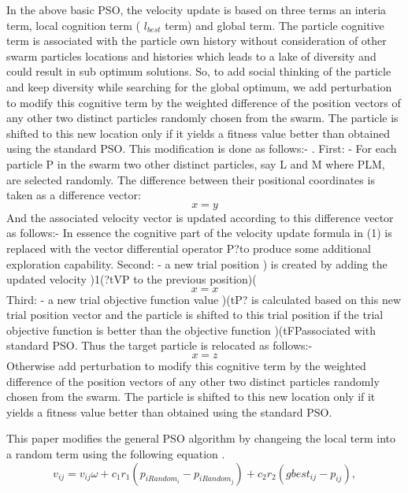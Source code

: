 \documentclass[10pt]{article}
\begin{document}
In the above basic PSO, the velocity update is based on three terms an interia term, local cognition term ( $l_{best}$ term) and global term.  The particle cognitive term is associated with the particle own history without consideration of other swarm particles locations and histories which leads to a lake of diversity and could result in sub optimum solutions. So, to add social thinking of the particle and keep diversity while searching for the global optimum, we add perturbation to modify this cognitive term by the weighted difference of the position vectors of any other two distinct particles randomly chosen from the swarm. The particle is shifted to this new location only if it yields a fitness value better than obtained using the standard PSO.
This modification is done as follows:-
\cite{stockPaper}.
First: - For each particle P in the swarm two other distinct particles, say L and M where PLM, are selected randomly. The difference between their positional coordinates is taken as a difference vector:
 \begin{equation}
 \label{eqmod}
 x=y
 \end{equation}
And the associated velocity vector is updated according to this difference vector as follows:-
 In essence the cognitive part of the velocity update formula in (1) is replaced with the vector differential operator P?to produce some additional exploration capability.
Second: - a new trial position ) is created by adding the updated velocity )1(?tVP to the previous position)( 
 \begin{equation}
 x=x
 \label{eq:mod1}
 \end{equation}
Third: - a new trial objective function value )(tP? is calculated based on this new trial position vector and the particle is shifted to this trial position if the trial objective function is better than the objective function )(tFPassociated with standard PSO. Thus the target particle is relocated as follows:-
  \begin{equation}
 \label{eq:mod2}
 x=z
 \end{equation}
Otherwise add perturbation to modify this cognitive term by the weighted difference of the position vectors of any other two distinct particles randomly chosen from the swarm. The particle is shifted to this new location only if it yields a fitness value better than obtained using the standard PSO.


This paper modifies the general PSO algorithm by changeing the local term into a random term using the following equation .  
  \begin{equation}
  v_{ij}  = v_{ij} \omega + c_1 r_1 (p_{iRandom_i}  - p_{iRandom_j} ) + c_2 r_2 (gbest_{ij}  - p_{ij} ),
  \label{eq:ModSwarm}
  \end{equation}
\end{document}
